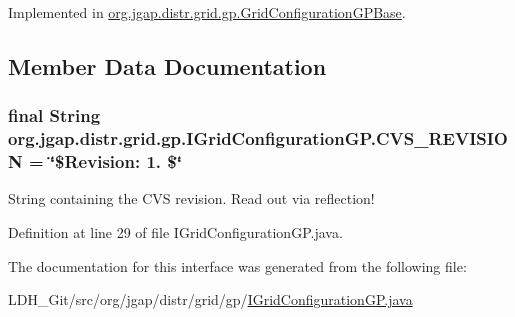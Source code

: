 Implemented in \hyperlink{classorg_1_1jgap_1_1distr_1_1grid_1_1gp_1_1_grid_configuration_g_p_base_abfb1b66ff707003ebbdbd8a848b76969}{org.\-jgap.\-distr.\-grid.\-gp.\-Grid\-Configuration\-G\-P\-Base}.



\subsection{Member Data Documentation}
\hypertarget{interfaceorg_1_1jgap_1_1distr_1_1grid_1_1gp_1_1_i_grid_configuration_g_p_af5be93d435c69963a95f2044ffced3c7}{
\subsubsection[{C\-V\-S\-\_\-\-R\-E\-V\-I\-S\-I\-O\-N}]{\setlength{\rightskip}{0pt plus 5cm}final String org.\-jgap.\-distr.\-grid.\-gp.\-I\-Grid\-Configuration\-G\-P.\-C\-V\-S\-\_\-\-R\-E\-V\-I\-S\-I\-O\-N = \char`\"{}\$Revision\-: 1. \$\char`\"{}\hspace{0.3cm}{\ttfamily [static]}}}\label{interfaceorg_1_1jgap_1_1distr_1_1grid_1_1gp_1_1_i_grid_configuration_g_p_af5be93d435c69963a95f2044ffced3c7}
String containing the C\-V\-S revision. Read out via reflection! 

Definition at line 29 of file I\-Grid\-Configuration\-G\-P.\-java.



The documentation for this interface was generated from the following file\-:\begin{DoxyCompactItemize}
\item 
L\-D\-H\-\_\-\-Git/src/org/jgap/distr/grid/gp/\hyperlink{_i_grid_configuration_g_p_8java}{I\-Grid\-Configuration\-G\-P.\-java}\end{DoxyCompactItemize}
